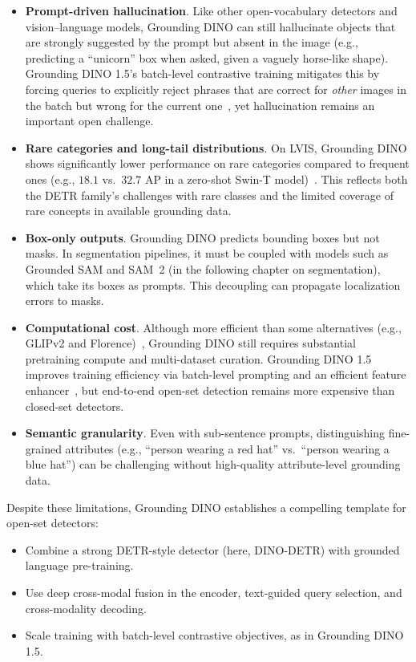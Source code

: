 \begin{enrichment}
\begin{enrichment}
	\begin{itemize}
		\item \textbf{Prompt-driven hallucination}. Like other open-vocabulary detectors and vision--language models, Grounding DINO can still hallucinate objects that are strongly suggested by the prompt but absent in the image (e.g., predicting a ``unicorn'' box when asked, given a vaguely horse-like shape). Grounding DINO 1.5’s batch-level contrastive training mitigates this by forcing queries to explicitly reject phrases that are correct for \emph{other} images in the batch but wrong for the current one~\cite{ren2024_groundingdino15}, yet hallucination remains an important open challenge.
		\item \textbf{Rare categories and long-tail distributions}. On LVIS, Grounding DINO shows significantly lower performance on rare categories compared to frequent ones (e.g., \(18.1\) vs.\ \(32.7\) AP in a zero-shot Swin-T model)~\cite{liu2023_groundingdino}. This reflects both the DETR family’s challenges with rare classes and the limited coverage of rare concepts in available grounding data.
		\item \textbf{Box-only outputs}. Grounding DINO predicts bounding boxes but not masks. In segmentation pipelines, it must be coupled with models such as Grounded SAM and SAM~2 (in the following chapter on segmentation), which take its boxes as prompts. This decoupling can propagate localization errors to masks.
		\item \textbf{Computational cost}. Although more efficient than some alternatives (e.g., GLIPv2 and Florence)~\cite{zhang2022_glipv2,yuan2021_florence}, Grounding DINO still requires substantial pretraining compute and multi-dataset curation. Grounding DINO 1.5 improves training efficiency via batch-level prompting and an efficient feature enhancer~\cite{ren2024_groundingdino15}, but end-to-end open-set detection remains more expensive than closed-set detectors.
		\item \textbf{Semantic granularity}. Even with sub-sentence prompts, distinguishing fine-grained attributes (e.g., ``person wearing a red hat'' vs.\ ``person wearing a blue hat'') can be challenging without high-quality attribute-level grounding data.
	\end{itemize}
	
	\noindent
	Despite these limitations, Grounding DINO establishes a compelling template for open-set detectors:
	
	\begin{itemize}
		\item Combine a strong DETR-style detector (here, DINO-DETR) with grounded language pre-training.
		\item Use deep cross-modal fusion in the encoder, text-guided query selection, and cross-modality decoding.
		\item Scale training with batch-level contrastive objectives, as in Grounding DINO 1.5.
	\end{itemize}
	

\end{enrichment}
\end{enrichment}
